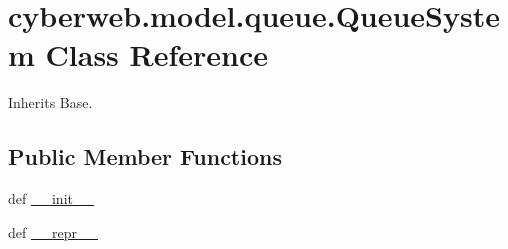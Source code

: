 \hypertarget{classcyberweb_1_1model_1_1queue_1_1_queue_system}{\section{cyberweb.\-model.\-queue.\-Queue\-System \-Class \-Reference}
\label{classcyberweb_1_1model_1_1queue_1_1_queue_system}
}


\-Inherits \-Base.

\subsection*{\-Public \-Member \-Functions}
\begin{DoxyCompactItemize}
\item 
def \hyperlink{classcyberweb_1_1model_1_1queue_1_1_queue_system_ab2090ab14ddb1b5f22ade3d43eec07c4}{\-\_\-\-\_\-init\-\_\-\-\_\-}
\item 
def \hyperlink{classcyberweb_1_1model_1_1queue_1_1_queue_system_afb138c3a7b097a11930d6251376c0d91}{\-\_\-\-\_\-repr\-\_\-\-\_\-}
\end{DoxyCompactItemize}
